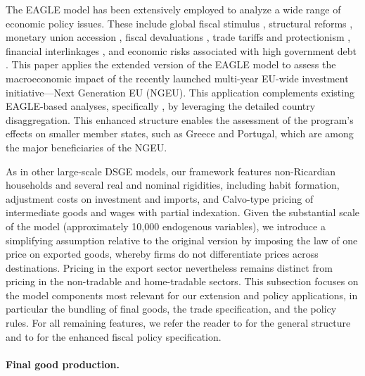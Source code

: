 \documentclass[a4paper,11pt]{article}
\numberwithin{equation}{section}
\begin{document}
The EAGLE model has been extensively employed to analyze a wide range of economic policy issues.
These include global fiscal stimulus \citep{GomesEtAl2015jimf}, structural reforms \citep{Gomesetal2013if,Jacquinot2018springer,Gomes2018jm}, monetary union accession \citep{BrzozaBrzezinaEtAl2014oer}, fiscal devaluations \citep{GomesEtAl2016em}, trade tariffs and protectionism \citep{BoltEtAl2019dnbwp,JacquinotEtAl2022jimf,ClancyEtAl2024ijcb}, financial interlinkages \citep{Pariesetal2016ecbwp,BokanEtAl2018em}, and economic risks associated with high government debt \citep{BurielEtAl2020ecbwp}.
This paper applies the extended version of the EAGLE model to assess the macroeconomic impact of the recently launched multi-year EU-wide investment initiative---Next Generation EU (NGEU).
This application complements existing EAGLE-based analyses, specifically \citet{Bankowskietal2025ecbOP}, by leveraging the detailed country disaggregation.
This enhanced structure enables the assessment of the program's effects on smaller member states, such as Greece and Portugal, which are among the major beneficiaries of the NGEU.

As in other large-scale DSGE models, our framework features non-Ricardian households and several real and nominal rigidities, including habit formation, adjustment costs on investment and imports, and Calvo-type pricing of intermediate goods and wages with partial indexation.
Given the substantial scale of the model (approximately 10,000 endogenous variables), we introduce a simplifying assumption relative to the original version by imposing the law of one price on exported goods, whereby firms do not differentiate prices across destinations.
Pricing in the export sector nevertheless remains distinct from pricing in the non-tradable and home-tradable sectors.
This subsection focuses on the model components most relevant for our extension and policy applications, in particular the bundling of final goods, the trade specification, and the policy rules.
For all remaining features, we refer the reader to \citet{GomesEtAl2010ecbwp} for the general structure and to \citet{Clancyetal2016} for the enhanced fiscal policy specification.

\paragraph{Final good production.}
\end{document}
